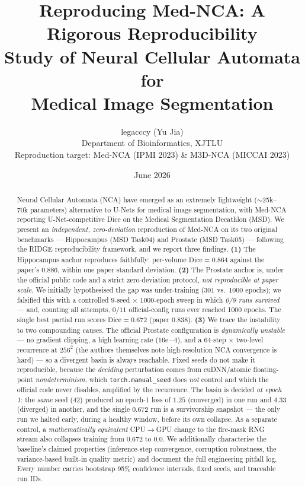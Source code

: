 \documentclass[10pt,twocolumn]{article}
\title{\vspace{-1.5em}\textbf{Reproducing Med-NCA: A Rigorous Reproducibility\\
Study of Neural Cellular Automata for\\ Medical Image Segmentation}}
\author{legacccy (Yu Jia)\\
\small Department of Bioinformatics, XJTLU\\
\small Reproduction target: Med-NCA (IPMI 2023) \& M3D-NCA (MICCAI 2023)}
\date{June 2026}
\newcommand{\dice}{\mathrm{Dice}}
\begin{document}
\maketitle

\begin{abstract}
\noindent
Neural Cellular Automata (NCA) have emerged as an extremely lightweight
($\sim$25k--70k parameters) alternative to U-Nets for medical image
segmentation, with Med-NCA reporting U-Net-competitive Dice on the Medical
Segmentation Decathlon (MSD). We present an \emph{independent,
zero-deviation} reproduction of Med-NCA on its two original benchmarks ---
Hippocampus (MSD Task04) and Prostate (MSD Task05) --- following the RIDGE
reproducibility framework, and we report three findings.
\textbf{(1)} The Hippocampus anchor reproduces faithfully: per-volume
$\dice = 0.864$ against the paper's $0.886$, within one paper standard
deviation.
\textbf{(2)} The Prostate anchor is, under the official public code and a
strict zero-deviation protocol, \emph{not reproducible at paper scale}.
We initially hypothesised the gap was under-training (301 vs.\ 1000
epochs); we falsified this with a controlled $9$-seed $\times$ 1000-epoch
sweep in which \emph{0/9 runs survived} --- and, counting all attempts,
$0/11$ official-config runs ever reached 1000 epochs. The single best
partial run scores $\dice = 0.672$ (paper $0.838$).
\textbf{(3)} We trace the instability to two compounding causes. The
official Prostate configuration is \emph{dynamically unstable} --- no
gradient clipping, a high learning rate ($16\mathrm{e}{-4}$), and a
$64$-step $\times$ two-level recurrence at $256^2$ (the authors themselves
note high-resolution NCA convergence is hard) --- so a divergent basin is
always reachable. Fixed seeds do not make it reproducible, because the
\emph{deciding} perturbation comes from cuDNN/atomic floating-point
\emph{nondeterminism}, which \texttt{torch.manual\_seed} does \emph{not}
control and which the official code never disables, amplified by the
recurrence. The basin is decided \emph{at epoch 1}: the \emph{same} seed
(42) produced an epoch-1 loss of $1.25$ (converged) in one run and $4.33$
(diverged) in another, and the single $0.672$ run is a survivorship snapshot
--- the only run we halted early, during a healthy window, before its own
collapse. As a separate control, a \emph{mathematically equivalent}
CPU$\rightarrow$GPU change to the fire-mask RNG stream also collapses
training from $0.672$ to $0.0$. We additionally
characterise the baseline's claimed properties (inference-step convergence,
corruption robustness, the variance-based built-in quality metric) and
document the full engineering pitfall log. Every number carries bootstrap
95\% confidence intervals, fixed seeds, and traceable run IDs.
\end{abstract}
\end{document}
